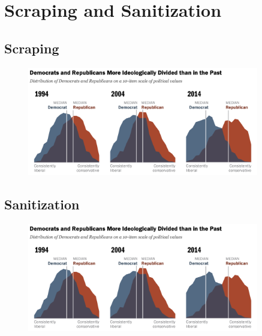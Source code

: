 \section{Scraping and Sanitization}
	
	\subsection{Scraping}
	
	
	
	
	\begin{figure}[ht]
		\centering
		\includegraphics[width=0.9\textwidth]{images/Kapitel1/PoliticalPolarization}
	\end{figure}
	
	
	
	
	
	
	\subsection{Sanitization}
	
	
	
	
	
	\begin{figure}[ht]
		\centering
		\includegraphics[width=0.9\textwidth]{images/Kapitel1/PoliticalPolarization}
	\end{figure}
	
	
	
	

